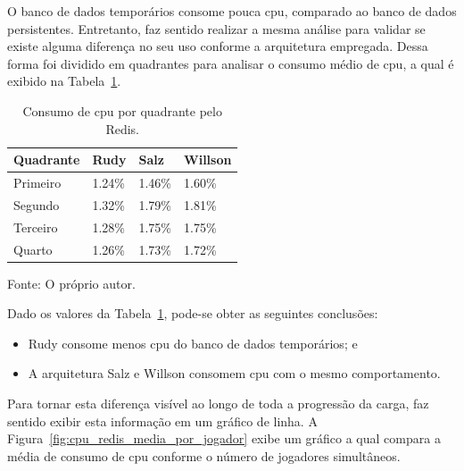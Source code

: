 O banco de dados temporários consome pouca \ac{cpu}, comparado ao banco de dados persistentes.
%
Entretanto, faz sentido realizar a mesma análise para validar se existe alguma diferença no seu uso conforme a arquitetura empregada.
%
Dessa forma foi dividido em quadrantes para analisar o consumo médio de \ac{cpu}, a qual é exibido na Tabela~\ref{tab:cpu_redis_media_quadrantes}.

\begin{table}[htb!]
\centering
\begin{adjustbox}{max width=\textwidth}
\caption{Consumo de \ac{cpu} por quadrante pelo Redis.}
\label{tab:cpu_redis_media_quadrantes}
\begin{tabular}{|l|l|l|l|}

\hline

Quadrante & Rudy    & Salz    & Willson \\ \hline

Primeiro  & 1.24\% & 1.46\% & 1.60\% \\ \hline

Segundo   & 1.32\% & 1.79\% & 1.81\% \\ \hline

Terceiro  & 1.28\% & 1.75\% & 1.75\% \\ \hline

Quarto    & 1.26\% & 1.73\% & 1.72\% \\ \hline

\end{tabular}

\end{adjustbox}

Fonte: O próprio autor.
\end{table}

Dado os valores da Tabela~\ref{tab:cpu_redis_media_quadrantes}, pode-se obter as seguintes conclusões:

\begin{itemize}
 \item Rudy consome menos \ac{cpu} do banco de dados temporários; e
 \item A arquitetura Salz e Willson consomem \ac{cpu} com o mesmo comportamento.
\end{itemize}

Para tornar esta diferença visível ao longo de toda a progressão da carga, faz sentido exibir esta informação em um gráfico de linha.
%
A Figura~\ref{fig:cpu_redis_media_por_jogador} exibe um gráfico a qual compara a média de consumo de \ac{cpu} conforme o número de jogadores simultâneos.

